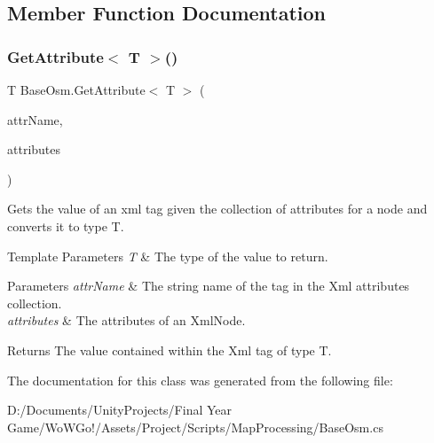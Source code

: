 \subsection{Member Function Documentation}
\mbox{\label{class_base_osm_a0307011e1ad1fc673bf8111cec1a7d59}} 
\subsubsection{\texorpdfstring{GetAttribute$<$ T $>$()}{GetAttribute< T >()}}
{\footnotesize\ttfamily T Base\+Osm.\+Get\+Attribute$<$ T $>$ (\begin{DoxyParamCaption}\item[{string}]{attr\+Name,  }\item[{Xml\+Attribute\+Collection}]{attributes }\end{DoxyParamCaption})\hspace{0.3cm}{\ttfamily [protected]}}



Gets the value of an xml tag given the collection of attributes for a node and converts it to type T. 


\begin{DoxyTemplParams}{Template Parameters}
{\em T} & The type of the value to return.\\
\hline
\end{DoxyTemplParams}

\begin{DoxyParams}{Parameters}
{\em attr\+Name} & The string name of the tag in the Xml attributes collection.\\
\hline
{\em attributes} & The attributes of an Xml\+Node.\\
\hline
\end{DoxyParams}
\begin{DoxyReturn}{Returns}
The value contained within the Xml tag of type T.
\end{DoxyReturn}


The documentation for this class was generated from the following file\+:\begin{DoxyCompactItemize}
\item 
D\+:/\+Documents/\+Unity\+Projects/\+Final Year Game/\+Wo\+W\+Go!/\+Assets/\+Project/\+Scripts/\+Map\+Processing/Base\+Osm.\+cs\end{DoxyCompactItemize}
